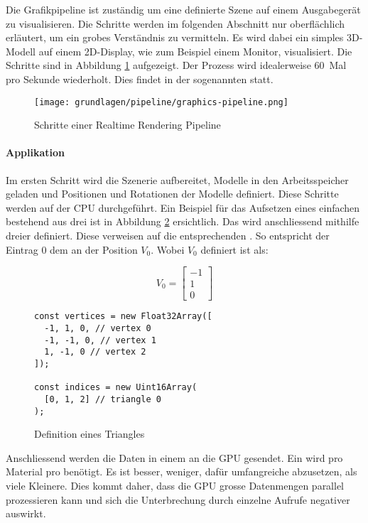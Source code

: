 Die Grafikpipeline ist zuständig um eine definierte Szene auf einem Ausgabegerät zu visualisieren. Die Schritte werden im folgenden Abschnitt nur oberflächlich erläutert, um ein grobes Verständnis zu vermitteln. Es wird dabei ein simples 3D-Modell auf einem 2D-Display, wie zum Beispiel einem Monitor, visualisiert. Die Schritte sind in Abbildung \ref{fig:renderingPipelineOverview} aufgezeigt. Der Prozess wird idealerweise 60 Mal pro Sekunde wiederholt. Dies findet in der sogenannten  statt.

\begin{figure}[H]
  \centering
  \texttt{[image: grundlagen/pipeline/graphics-pipeline.png]}
  \caption{Schritte einer Realtime Rendering Pipeline}
  \label{fig:renderingPipelineOverview}
\end{figure}

\paragraph{Applikation}
Im ersten Schritt wird die Szenerie aufbereitet, Modelle in den Arbeitsspeicher geladen und Positionen und Rotationen der Modelle definiert. Diese Schritte werden auf der CPU durchgeführt. Ein Beispiel für das Aufsetzen eines einfachen  bestehend aus drei  ist in Abbildung \ref{fig:geometryDefinition} ersichtlich. Das  wird anschliessend mithilfe dreier  definiert. Diese  verweisen auf die entsprechenden . So entspricht der Eintrag $0$ dem  an der Position $V_0$. Wobei $V_0$ definiert ist als:

$$
V_0 = \begin{bmatrix}
  -1 \\
  1 \\
  0
\end{bmatrix}
$$

\begin{figure}[H]
\begin{lstlisting}[style=JavaScript]
const vertices = new Float32Array([
  -1, 1, 0, // vertex 0
  -1, -1, 0, // vertex 1
  1, -1, 0 // vertex 2
]);

const indices = new Uint16Array(
  [0, 1, 2] // triangle 0
);
\end{lstlisting}
\caption{Definition eines Triangles}
\label{fig:geometryDefinition}
\end{figure}

Anschliessend werden die Daten in einem  an die GPU gesendet. Ein  wird pro Material pro  benötigt. Es ist besser, weniger, dafür umfangreiche  abzusetzen, als viele Kleinere. Dies kommt daher, dass die GPU grosse Datenmengen parallel prozessieren kann und sich die Unterbrechung durch einzelne Aufrufe negativer auswirkt.

